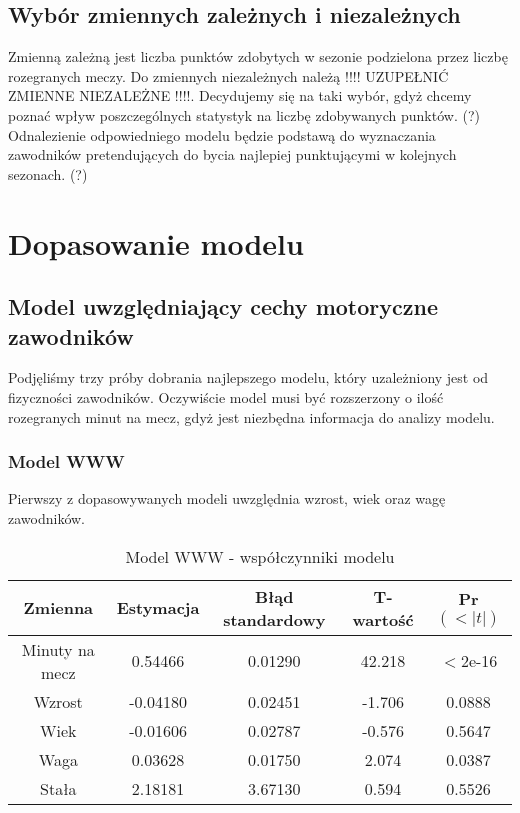 \documentclass[11pt,a4paper]{article}
\begin{document}
\subsection{Wybór zmiennych zależnych i niezależnych}
	Zmienną zależną jest liczba punktów zdobytych w sezonie podzielona przez liczbę rozegranych meczy. Do zmiennych niezależnych należą !!!! UZUPEŁNIĆ ZMIENNE NIEZALEŻNE !!!!. Decydujemy się na taki wybór, gdyż chcemy poznać wpływ poszczególnych statystyk na liczbę zdobywanych punktów. (?) Odnalezienie odpowiedniego modelu będzie podstawą do wyznaczania zawodników pretendujących do bycia najlepiej punktującymi w kolejnych sezonach. (?)
	
\section{Dopasowanie modelu}
\subsection{Model uwzględniający cechy motoryczne zawodników}
Podjęliśmy trzy próby dobrania najlepszego modelu, który uzależniony jest od fizyczności zawodników. Oczywiście model musi być rozszerzony o ilość rozegranych minut na mecz, gdyż jest niezbędna informacja do analizy modelu.

\subsubsection{Model WWW}
Pierwszy z dopasowywanych modeli uwzględnia wzrost, wiek oraz wagę zawodników. 

\begin{table}[H]
	\begin{tabular}{| c | c | c | c | c |}
		\hline
		Zmienna & Estymacja & Błąd standardowy & T-wartość & Pr$(<|t|)$\\ \hline
		Minuty na mecz & 0.54466 & 0.01290 & 42.218 & $<$2e-16\\ \hline
		Wzrost & -0.04180 & 0.02451 & -1.706 & 0.0888\\ \hline
		Wiek & -0.01606 & 0.02787 & -0.576 & 0.5647\\ \hline 
		Waga & 0.03628 & 0.01750 & 2.074 & 0.0387\\ \hline
		Stała & 2.18181 & 3.67130 & 0.594 & 0.5526 \\ \hline
	\end{tabular}
\caption{Model WWW - współczynniki modelu}
\end{table}
	
\end{document}
